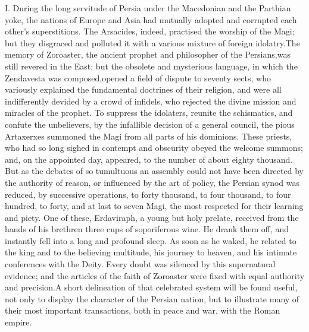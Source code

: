 





I. During the long servitude of Persia under the Macedonian and
the Parthian yoke, the nations of Europe and Asia had mutually
adopted and corrupted each other’s superstitions. The Arsacides,
indeed, practised the worship of the Magi; but they disgraced and
polluted it with a various mixture of foreign idolatry.\footnotemark[601] The
memory of Zoroaster, the ancient prophet and philosopher of the
Persians,\footnotemark[7] was still revered in the East; but the obsolete and
mysterious language, in which the Zendavesta was composed,\footnotemark[8]
opened a field of dispute to seventy sects, who variously
explained the fundamental doctrines of their religion, and were
all indifferently devided by a crowd of infidels, who rejected
the divine mission and miracles of the prophet. To suppress the
idolaters, reunite the schismatics, and confute the unbelievers,
by the infallible decision of a general council, the pious
Artaxerxes summoned the Magi from all parts of his dominions.
These priests, who had so long sighed in contempt and obscurity
obeyed the welcome summons; and, on the appointed day, appeared,
to the number of about eighty thousand. But as the debates of so
tumultuous an assembly could not have been directed by the
authority of reason, or influenced by the art of policy, the
Persian synod was reduced, by successive operations, to forty
thousand, to four thousand, to four hundred, to forty, and at
last to seven Magi, the most respected for their learning and
piety. One of these, Erdaviraph, a young but holy prelate,
received from the hands of his brethren three cups of
soporiferous wine. He drank them off, and instantly fell into a
long and profound sleep. As soon as he waked, he related to the
king and to the believing multitude, his journey to heaven, and
his intimate conferences with the Deity. Every doubt was silenced
by this supernatural evidence; and the articles of the faith of
Zoroaster were fixed with equal authority and precision.\footnotemark[9] A
short delineation of that celebrated system will be found useful,
not only to display the character of the Persian nation, but to
illustrate many of their most important transactions, both in
peace and war, with the Roman empire.\footnotemark[10]

